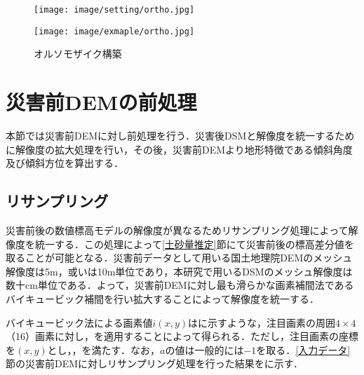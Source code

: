       \begin{figure}[tbp]
        \begin{minipage}[c]{0.45\hsize}
          \centering
          \texttt{[image: image/setting/ortho.jpg]}
        \end{minipage}
        \begin{minipage}[c]{0.45\hsize}
          \centering
          \texttt{[image: image/exmaple/ortho.jpg]}
        \end{minipage}
        \caption{オルソモザイク構築}
        \label{オルソモザイク構築結果}
      \end{figure}



  \section{災害前DEMの前処理}
    \label{災害前DEMの前処理}
    本節では災害前DEMに対し前処理を行う．災害後DSMと解像度を統一するために解像度の拡大処理を行い，その後，災害前DEMより地形特徴である傾斜角度及び傾斜方位を算出する．


    \subsection{リサンプリング}
      \label{リサンプリング}
      災害前後の数値標高モデルの解像度が異なるためリサンプリング処理によって解像度を統一する．この処理によって\ref{土砂量推定}節にて災害前後の標高差分値を取ることが可能となる．災害前データとして用いる国土地理院DEMのメッシュ解像度は5m，或いは10m単位であり，本研究で用いるDSMのメッシュ解像度は数十cm単位である．よって，災害前DEMに対し最も滑らかな画素補間法であるバイキュービック補間\cite{バイキュービック法}を行い拡大することによって解像度を統一する．
      
      バイキュービック法による画素値$i(x,y)$はに示すような，注目画素の周囲$4\times4$（16）画素に対し，を適用することによって得られる．ただし，注目画素の座標を$(x,y)$とし，，を満たす．なお，$a$の値は一般的には$-1$を取る．\ref{入力データ}節の災害前DEMに対しリサンプリング処理を行った結果をに示す．

